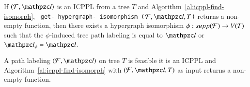 \documentclass[MS,synopsis]{iitmdiss}
\begin{document}


\begin{lemma}
  \label{lem:hyperiso}  %
  If $(\cF, \cl)$ is an ICPPL from a tree $T$ and
  Algorithm~\ref{al:icppl-find-isomorph}, {\tt
    get- hypergraph- isomorphism ($\cF, \cl, T$)} returns a non-empty
  function, then there exists a hypergraph isomorphism $\phi :
  supp({\cal F}) \rightarrow V(T)$ such that the $\phi$-induced tree path
  labeling is equal to $\cl$ or $\cl_\phi = \cl$.
\end{lemma}

\begin{theorem}
  \label{th:charac}
  A path labeling $(\cF, \cl)$ on tree $T$ is feasible \iff it is an
  ICPPL and Algorithm~\ref{al:icppl-find-isomorph} with $(\cF, \cl,
  T)$ as input returns a non-empty function.
\end{theorem}
\end{document}
